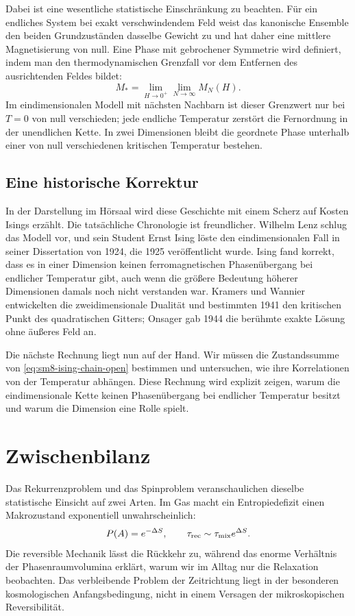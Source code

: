 Dabei ist eine wesentliche statistische Einschränkung zu beachten. Für ein endliches System bei exakt verschwindendem Feld weist das kanonische Ensemble den beiden Grundzuständen dasselbe Gewicht zu und hat daher eine mittlere Magnetisierung von null. Eine Phase mit gebrochener Symmetrie wird definiert, indem man den thermodynamischen Grenzfall vor dem Entfernen des ausrichtenden Feldes bildet:
\begin{equation}
 M_*=\lim_{H\to0^+}\lim_{N\to\infty}M_N(H).
 \label{eq:sm8-order-of-limits}
\end{equation}
Im eindimensionalen Modell mit nächsten Nachbarn ist dieser Grenzwert nur bei \(T=0\) von null verschieden; jede endliche Temperatur zerstört die Fernordnung in der unendlichen Kette. In zwei Dimensionen bleibt die geordnete Phase unterhalb einer von null verschiedenen kritischen Temperatur bestehen.

\subsection{Eine historische Korrektur}

In der Darstellung im Hörsaal wird diese Geschichte mit einem Scherz auf Kosten Isings erzählt. Die tatsächliche Chronologie ist freundlicher. Wilhelm Lenz schlug das Modell vor, und sein Student Ernst Ising löste den eindimensionalen Fall in seiner Dissertation von 1924, die 1925 veröffentlicht wurde. Ising fand korrekt, dass es in einer Dimension keinen ferromagnetischen Phasenübergang bei endlicher Temperatur gibt, auch wenn die größere Bedeutung höherer Dimensionen damals noch nicht verstanden war. Kramers und Wannier entwickelten die zweidimensionale Dualität und bestimmten 1941 den kritischen Punkt des quadratischen Gitters; Onsager gab 1944 die berühmte exakte Lösung ohne äußeres Feld an.

Die nächste Rechnung liegt nun auf der Hand. Wir müssen die Zustandssumme von \eqref{eq:sm8-ising-chain-open} bestimmen und untersuchen, wie ihre Korrelationen von der Temperatur abhängen. Diese Rechnung wird explizit zeigen, warum die eindimensionale Kette keinen Phasenübergang bei endlicher Temperatur besitzt und warum die Dimension eine Rolle spielt.

\section{Zwischenbilanz}

Das Rekurrenzproblem und das Spinproblem veranschaulichen dieselbe statistische Einsicht auf zwei Arten. Im Gas macht ein Entropiedefizit einen Makrozustand exponentiell unwahrscheinlich:
\begin{equation}
 P(A)=e^{-\Delta S},
 \qquad
 \tau_{\rm rec}\sim\tau_{\rm mix}e^{\Delta S}.
 \label{eq:sm8-summary-recurrence}
\end{equation}
Die reversible Mechanik lässt die Rückkehr zu, während das enorme Verhältnis der Phasenraumvolumina erklärt, warum wir im Alltag nur die Relaxation beobachten. Das verbleibende Problem der Zeitrichtung liegt in der besonderen kosmologischen Anfangsbedingung, nicht in einem Versagen der mikroskopischen Reversibilität.

